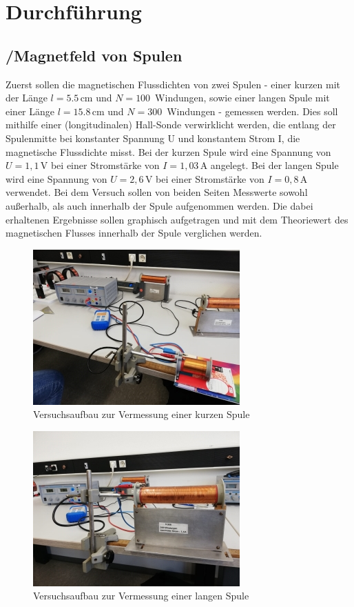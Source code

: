 \section{Durchführung}
\label{sec:Durchführung}

\subsection{/Magnetfeld von Spulen}

Zuerst sollen die magnetischen Flussdichten von zwei Spulen - einer kurzen mit der Länge 
$l = 5.5\, \si{\centi\meter}$ und $N = 100\,$ Windungen, sowie einer langen Spule mit einer Länge
$l = 15.8\, \si{\cm}$ und $N = 300\,$ Windungen - gemessen werden. Dies soll mithilfe einer
(longitudinalen) Hall-Sonde verwirklicht werden, die entlang der Spulenmitte bei konstanter Spannung U und konstantem
Strom I, die magnetische Flussdichte misst. Bei der kurzen Spule wird eine Spannung von $U = 1,1\, \si{\volt}$ 
bei einer Stromstärke von $I = 1,03\, \si{\ampere}$ angelegt. Bei der langen Spule wird eine Spannung 
von $U = 2,6\, \si{\volt}$ bei einer Stromstärke von $I = 0,8\, \si{\ampere}$ verwendet. Bei dem Versuch sollen 
von beiden Seiten Messwerte sowohl außerhalb, als auch
innerhalb der Spule aufgenommen werden.
Die dabei erhaltenen Ergebnisse sollen graphisch aufgetragen und mit dem Theoriewert des magnetischen Flusses
innerhalb der Spule verglichen werden.

\begin{figure}[H]
    \centering
    \includegraphics{content/Spule2.jpg}
    \caption{Versuchsaufbau zur Vermessung einer kurzen Spule }
    \label{KurzeSpule}
\end{figure}
\begin{figure}[H]
\centering
    \includegraphics{content/Spule1.jpg}
    \caption{Versuchsaufbau zur Vermessung einer langen Spule }
    \label{LangeSpule}
\end{figure}


